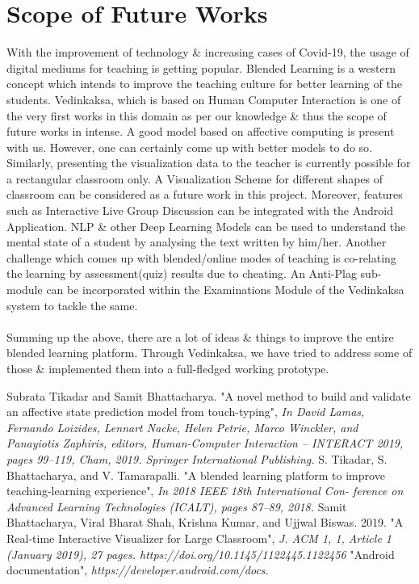 \documentclass[10pt]{report}
\begin{document}
\section{Scope of Future Works}
With the improvement of technology \& increasing cases of Covid-19, the usage of digital mediums for teaching is getting popular. Blended Learning is a western concept which intends to improve the teaching culture for better learning of the students. Vedinkaksa, which is based on Human Computer Interaction is one of the very first works in this domain as per our knowledge \& thus the scope of future works in intense.
A good model based on affective computing is present with us. However, one can certainly come up with better models to do so. Similarly, presenting the visualization data to the teacher is currently possible for a rectangular classroom only. A Visualization Scheme for different shapes of classroom can be considered as a future work in this project. Moreover, features such as Interactive Live Group Discussion can be integrated with the Android Application. NLP \& other Deep Learning Models can be used to understand the mental state of a student by analysing the text written by him/her. Another challenge which comes up with blended/online modes of teaching is co-relating the learning by assessment(quiz) results due to cheating. An Anti-Plag sub-module can be incorporated within the Examinations Module of the Vedinkaksa system to tackle the same. \\ \\
Summing up the above, there are a lot of ideas \& things to improve the entire blended learning platform. Through Vedinkaksa, we have tried to address some of those \& implemented them into a full-fledged working prototype.  
\begin{thebibliography}{4}
	Subrata Tikadar and Samit Bhattacharya. "A novel method to build and validate an affective state prediction model from touch-typing",
\emph{In David Lamas, Fernando Loizides, Lennart Nacke, Helen Petrie, Marco Winckler, and Panayiotis Zaphiris, editors, Human-Computer Interaction – INTERACT 2019, pages 99–119, Cham, 2019. Springer International Publishing.}
	S. Tikadar, S. Bhattacharya, and V. Tamarapalli. "A blended learning platform to improve teaching-learning experience", \emph{In 2018 IEEE 18th International Con- ference on Advanced Learning Technologies (ICALT), pages 87–89, 2018.}
	Samit Bhattacharya, Viral Bharat Shah, Krishna Kumar, and Ujjwal Biswas. 2019. "A Real-time Interactive Visualizer for Large Classroom", \emph{J. ACM 1, 1, Article 1 (January 2019), 27 pages. https://doi.org/10.1145/1122445.1122456}
	"Android documentation", \emph{https://developer.android.com/docs.}
\end{thebibliography}  
\end{document}
